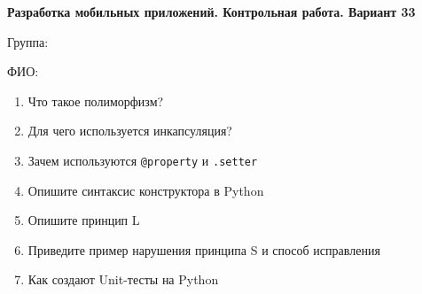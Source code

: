 \documentclass[12pt]{article}
\begin{document}
\vspace{40pt}\begin{minipage}{\textwidth}
\textbf{Разработка мобильных приложений. Контрольная работа. Вариант 33}

Группа: \underline{\hspace{3cm}}

ФИО: \underline{\hspace{10cm}}

\begin{enumerate}
\item Что такое полиморфизм?
\item Для чего используется инкапсуляция?
\item Зачем используются \verb|@property| и \verb|.setter|
\item Опишите синтаксис конструктора в Python
\item Опишите принцип L
\item Приведите пример нарушения принципа S и способ исправления
\item Как создают Unit-тесты на Python

\end{enumerate}
\end{minipage}

\vspace{40pt}
\end{document}
